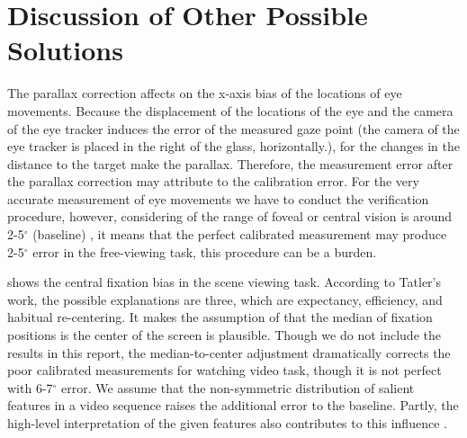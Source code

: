 \documentclass{article}
\begin{document}
\section{Discussion of Other Possible Solutions}

The parallax correction affects on the x-axis bias of the locations of eye movements. Because the displacement of the locations of the eye and the camera of the eye tracker induces the error of the measured gaze point (the camera of the eye tracker is placed in the right of the glass, horizontally.), for the changes in the distance to the target make the parallax. Therefore, the measurement error after the parallax correction may attribute to the calibration error. For the very accurate measurement of eye movements we have to conduct the verification procedure, however, considering of the range of foveal or central vision is around 2-5$^{\circ}$ (baseline) \citep{mcmorris2014acquisition}, it means that the perfect calibrated measurement may produce 2-5$^{\circ}$ error in the free-viewing task, this procedure can be a burden.

\cite{tatler2007central} shows the central fixation bias in the scene viewing task. According to Tatler's work, the possible explanations are three, which are expectancy, efficiency, and habitual re-centering. It makes the assumption of that the median of fixation positions is the center of the screen is plausible. Though we do not include the results in this report, the median-to-center adjustment dramatically corrects the poor calibrated measurements for watching video task, though it is not perfect with 6-7$^{\circ}$ error. We assume that the non-symmetric distribution of salient features in a video sequence raises the additional error to the baseline. Partly, the high-level interpretation of the given features also contributes to this influence \citep{tatler2005visual}.







\end{document}
